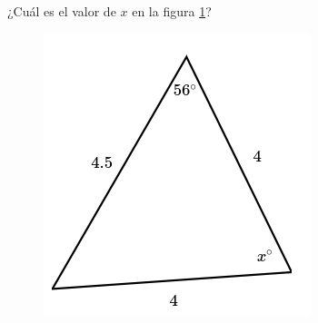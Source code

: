 ¿Cuál es el valor de $x$ en la figura \ref{fig:findangle06}?

\begin{minipage}[t][][t]{0.35\textwidth}
    \begin{figure}[H]
        \centering
        \includegraphics[width=0.9\linewidth]{../images/findangle06.png}
        \caption{}
        \label{fig:findangle06}
    \end{figure}
\end{minipage}\hfill
